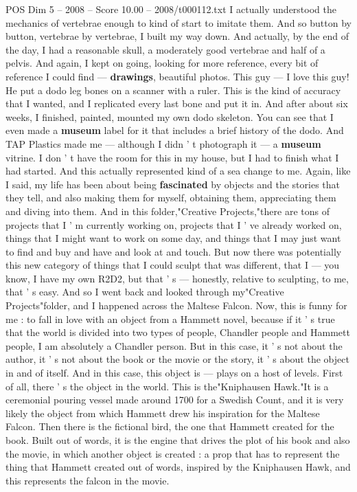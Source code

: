 \begin{textsample}{POS Dim 5 – 2008 – Score 10.00 – 2008/t000112.txt}
I actually understood the mechanics of vertebrae enough to kind of start to imitate them.
And so button by button, vertebrae by vertebrae, I built my way down.
And actually, by the end of the day, I had a reasonable skull, a moderately good vertebrae and half of a pelvis.
And again, I kept on going, looking for more reference, every bit of reference I could find — \textbf{drawings}, beautiful photos.
This guy — I love this guy!
He put a dodo leg bones on a scanner with a ruler.
This is the kind of accuracy that I wanted, and I replicated every last bone and put it in.
And after about six weeks, I finished, painted, mounted my own dodo skeleton.
You can see that I even made a \textbf{museum} label for it that includes a brief history of the dodo.
And TAP Plastics made me — although I didn ' t photograph it — a \textbf{museum} vitrine.
I don ' t have the room for this in my house, but I had to finish what I had started.
And this actually represented kind of a sea change to me.
Again, like I said, my life has been about being \textbf{fascinated} by objects and the stories that they tell, and also making them for myself, obtaining them, appreciating them and diving into them.
And in this folder,"Creative Projects,"there are tons of projects that I ' m currently working on, projects that I ' ve already worked on, things that I might want to work on some day, and things that I may just want to find and buy and have and look at and touch.
But now there was potentially this new category of things that I could sculpt that was different, that I — you know, I have my own R2D2, but that ' s — honestly, relative to sculpting, to me, that ' s easy.
And so I went back and looked through my"Creative Projects"folder, and I happened across the Maltese Falcon.
Now, this is funny for me : to fall in love with an object from a Hammett novel, because if it ' s true that the world is divided into two types of people, Chandler people and Hammett people, I am absolutely a Chandler person.
But in this case, it ' s not about the author, it ' s not about the book or the movie or the story, it ' s about the object in and of itself.
And in this case, this object is — plays on a host of levels.
First of all, there ' s the object in the world.
This is the"Kniphausen Hawk."It is a ceremonial pouring vessel made around 1700 for a Swedish Count, and it is very likely the object from which Hammett drew his inspiration for the Maltese Falcon.
Then there is the fictional bird, the one that Hammett created for the book.
Built out of words, it is the engine that drives the plot of his book and also the movie, in which another object is created : a prop that has to represent the thing that Hammett created out of words, inspired by the Kniphausen Hawk, and this represents the falcon in the movie.

\end{textsample}
